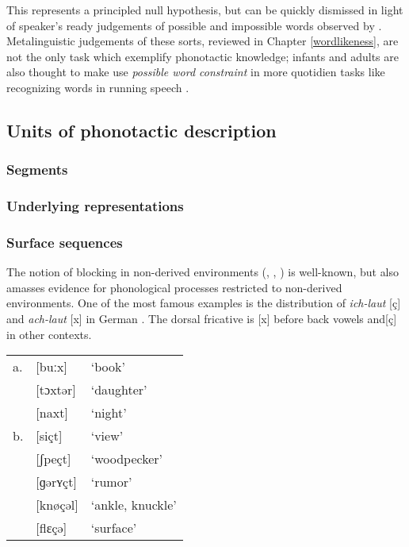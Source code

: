 This represents a principled null hypothesis, but can be quickly dismissed in light of speaker's ready judgements of possible and impossible words observed by \citeauthor{Chomsky1965}. Metalinguistic judgements of these sorts, reviewed in Chapter \ref{wordlikeness}, are not the only task which exemplify phonotactic knowledge; infants and adults are also thought to make use \emph{possible word constraint} in more quotidien tasks like recognizing words in running speech \citep[e.g.,][]{Brown1956,Mattys1999,McQueen1998b,Norris1997}.

\subsection{Units of phonotactic description}

\subsubsection{Segments}

\subsubsection{Underlying representations}

\subsubsection{Surface sequences}


The notion of blocking in non-derived environments (\citealp[163]{Kiparsky1973a}, \citeyear[152]{Kiparsky1982a}, \citealp{Mascaro1976}) is well-known, but \citet{Hall2006} also amasses evidence for phonological processes restricted to non-derived environments. One of the most famous examples is the distribution of \emph{ich-laut} [ç] and \emph{ach-laut} [x] in German \citep{Bloomfield1930}. The dorsal fricative is [x] before back vowels and[ç] in other contexts.

\begin{example}
\begin{tabular}{l l l}
a. & [buːx]   & `book'           \\
   & [tɔxtər] & `daughter'       \\
   & [naxt]   & `night'          \\
b. & [siçt]   & `view'           \\
   & [ʃpeçt]  & `woodpecker'     \\
   & [ɡərʏçt] & `rumor'          \\
   & [knøçəl] & `ankle, knuckle' \\
   & [flɛçə]  & `surface'        \\
\end{tabular}
\end{example}

